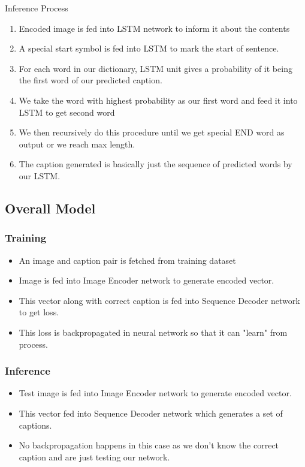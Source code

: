 \documentclass[11pt]{article}
\begin{document}
			\begin{subsubsection}{Inference Process}
				\begin{enumerate}
				\item Encoded image is fed into LSTM network to inform it about the contents
				\item A special start symbol is fed into LSTM to mark the start of sentence.
				\item For each word in our dictionary, LSTM unit gives a probability of it being the first word of our predicted caption.
				\item We take the word with highest probability as our first word and feed it into LSTM to get second word
				\item We then recursively do this procedure until we get special END word as output or we reach max length.
				\item The caption generated is basically just the sequence of predicted words by our LSTM.
				\end{enumerate}
			\end{subsubsection}
		\subsection{Overall Model}
			\subsubsection{Training}
				\begin{itemize}
				\item An image and caption pair is fetched from training dataset
				\item Image is fed into Image Encoder network to generate encoded vector.
				\item This vector along with correct caption is fed into Sequence Decoder network to get loss.
				\item This loss is backpropagated in neural network so that it can "learn" from process.
				\end{itemize}
			\subsubsection{Inference}
				\begin{itemize}
				\item Test image is fed into Image Encoder network to generate encoded vector.
				\item This vector fed into Sequence Decoder network which generates a set of captions.
				\item No backpropagation happens in this case as we don't know the correct caption and are just testing our network.
				\end{itemize}	
	
\end{document}
